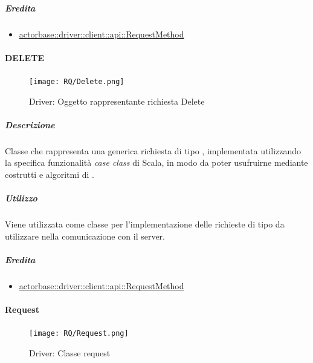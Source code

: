 \documentclass{scalatekids-article}
\begin{document}
\subparagraph{Eredita}

\begin{itemize}
\item \hyperref[sec:actorbase::driver::client::api::RequestMethod]{actorbase::driver::client::api::RequestMethod}
\end{itemize}


\paragraph{DELETE}
\label{sec:actorbase::driver::client::api::DELETE}

\begin{figure}[H]
  \begin{center}
    \texttt{[image: RQ/Delete.png]}
    \caption{Driver: Oggetto rappresentante richiesta Delete}
  \end{center}
\end{figure}

\subparagraph{Descrizione}

Classe che rappresenta una generica richiesta  di tipo
, implementata utilizzando la specifica funzionalità \textit{case
  class} di Scala, in modo da poter usufruirne mediante costrutti e algoritmi di
.

\subparagraph{Utilizzo}

Viene utilizzata come classe per l'implementazione delle richieste 
di tipo  da utilizzare nella comunicazione con il server.

\subparagraph{Eredita}

\begin{itemize}
\item \hyperref[sec:actorbase::driver::client::api::RequestMethod]{actorbase::driver::client::api::RequestMethod}
\end{itemize}


\paragraph{Request}
\label{sec:actorbase::driver::client::api::Request}

\begin{figure}[H]
  \begin{center}
    \texttt{[image: RQ/Request.png]}
    \caption{Driver: Classe request}
  \end{center}
\end{figure}
\end{document}
